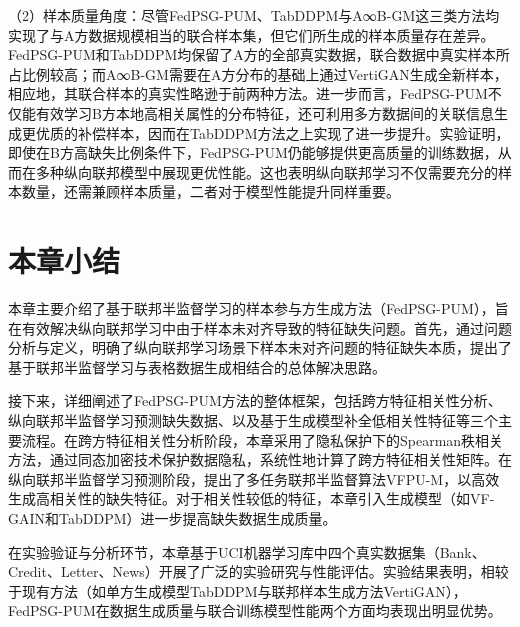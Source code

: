 （2）样本质量角度：尽管FedPSG-PUM、TabDDPM与A∞B-GM这三类方法均实现了与A方数据规模相当的联合样本集，但它们所生成的样本质量存在差异。FedPSG-PUM和TabDDPM均保留了A方的全部真实数据，联合数据中真实样本所占比例较高；而A∞B-GM需要在A方分布的基础上通过VertiGAN生成全新样本，相应地，其联合样本的真实性略逊于前两种方法。进一步而言，FedPSG-PUM不仅能有效学习B方本地高相关属性的分布特征，还可利用多方数据间的关联信息生成更优质的补偿样本，因而在TabDDPM方法之上实现了进一步提升。实验证明，即使在B方高缺失比例条件下，FedPSG-PUM仍能够提供更高质量的训练数据，从而在多种纵向联邦模型中展现更优性能。这也表明纵向联邦学习不仅需要充分的样本数量，还需兼顾样本质量，二者对于模型性能提升同样重要。
\section{本章小结}
本章主要介绍了基于联邦半监督学习的样本参与方生成方法（FedPSG-PUM），旨在有效解决纵向联邦学习中由于样本未对齐导致的特征缺失问题。首先，通过问题分析与定义，明确了纵向联邦学习场景下样本未对齐问题的特征缺失本质，提出了基于联邦半监督学习与表格数据生成相结合的总体解决思路。

接下来，详细阐述了FedPSG-PUM方法的整体框架，包括跨方特征相关性分析、纵向联邦半监督学习预测缺失数据、以及基于生成模型补全低相关性特征等三个主要流程。在跨方特征相关性分析阶段，本章采用了隐私保护下的Spearman秩相关方法，通过同态加密技术保护数据隐私，系统性地计算了跨方特征相关性矩阵。在纵向联邦半监督学习预测阶段，提出了多任务联邦半监督算法VFPU-M，以高效生成高相关性的缺失特征。对于相关性较低的特征，本章引入生成模型（如VF-GAIN和TabDDPM）进一步提高缺失数据生成质量。

在实验验证与分析环节，本章基于UCI机器学习库中四个真实数据集（Bank、Credit、Letter、News）开展了广泛的实验研究与性能评估。实验结果表明，相较于现有方法（如单方生成模型TabDDPM与联邦样本生成方法VertiGAN），FedPSG-PUM在数据生成质量与联合训练模型性能两个方面均表现出明显优势。



